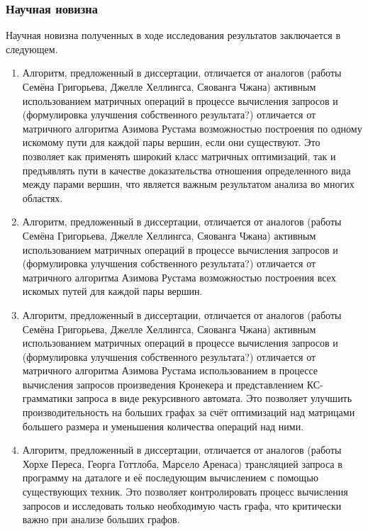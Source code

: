 \subsubsection*{\large{Научная новизна}}

Научная новизна полученных в ходе исследования результатов заключается в следующем.

\begin{enumerate}

\item Алгоритм, предложенный в диссертации, отличается от аналогов (работы Семёна Григорьева, Джелле Хеллингса, Сяованга Чжана) активным использованием матричных операций в процессе вычисления запросов и (формулировка улучшения собственного результата?) отличается от матричного алгоритма Азимова Рустама возможностью построения по одному искомому пути для каждой пары вершин, если они существуют. Это позволяет как применять широкий класс матричных оптимизаций, так и предъявлять пути в качестве доказательства отношения определенного вида между парами вершин, что является важным результатом анализа во многих областях.

\item Алгоритм, предложенный в диссертации, отличается от аналогов (работы Семёна Григорьева, Джелле Хеллингса, Сяованга Чжана) активным использованием матричных операций в процессе вычисления запросов и (формулировка улучшения собственного результата?) отличается от матричного алгоритма Азимова Рустама возможностью построения всех искомых путей для каждой пары вершин.

\item Алгоритм, предложенный в диссертации, отличается от аналогов (работы Семёна Григорьева, Джелле Хеллингса, Сяованга Чжана) активным использованием матричных операций в процессе вычисления запросов и (формулировка улучшения собственного результата?) отличается от матричного алгоритма Азимова Рустама использованием в процессе вычисления запросов произведения Кронекера и представлением КС-грамматики запроса в виде рекурсивного автомата. Это позволяет улучшить производительность на больших графах за счёт оптимизаций над матрицами большего размера и уменьшения количества операций над ними.

\item Алгоритм, предложенный в диссертации, отличается от аналогов (работы Хорхе Переса, Георга Готтлоба, Марсело Аренаса) трансляцией запроса в программу на даталоге и её последующим вычислением с помощью существующих техник. Это позволяет контролировать процесс вычисления запросов и исследовать только необходимую часть графа, что критически важно при анализе больших графов.

\end{enumerate}


